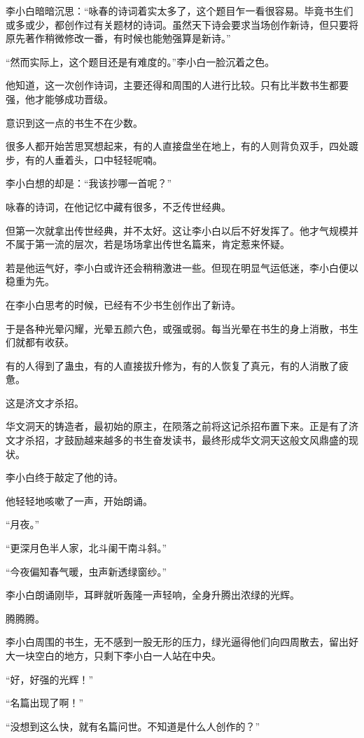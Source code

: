 \begin{this_body}
李小白暗暗沉思：“咏春的诗词着实太多了，这个题目乍一看很容易。毕竟书生们或多或少，都创作过有关题材的诗词。虽然天下诗会要求当场创作新诗，但只要将原先著作稍微修改一番，有时候也能勉强算是新诗。”

“然而实际上，这个题目还是有难度的。”李小白一脸沉着之色。

他知道，这一次创作诗词，主要还得和周围的人进行比较。只有比半数书生都要强，他才能够成功晋级。

意识到这一点的书生不在少数。

很多人都开始苦思冥想起来，有的人直接盘坐在地上，有的人则背负双手，四处踱步，有的人垂着头，口中轻轻呢喃。

李小白想的却是：“我该抄哪一首呢？”

咏春的诗词，在他记忆中藏有很多，不乏传世经典。

但第一次就拿出传世经典，并不太好。这让李小白以后不好发挥了。他才气规模并不属于第一流的层次，若是场场拿出传世名篇来，肯定惹来怀疑。

若是他运气好，李小白或许还会稍稍激进一些。但现在明显气运低迷，李小白便以稳重为先。

在李小白思考的时候，已经有不少书生创作出了新诗。

于是各种光晕闪耀，光晕五颜六色，或强或弱。每当光晕在书生的身上消散，书生们就都有收获。

有的人得到了蛊虫，有的人直接拔升修为，有的人恢复了真元，有的人消散了疲惫。

这是济文才杀招。

华文洞天的铸造者，最初始的原主，在陨落之前将这记杀招布置下来。正是有了济文才杀招，才鼓励越来越多的书生奋发读书，最终形成华文洞天这般文风鼎盛的现状。

李小白终于敲定了他的诗。

他轻轻地咳嗽了一声，开始朗诵。

“月夜。”

“更深月色半人家，北斗阑干南斗斜。”

“今夜偏知春气暖，虫声新透绿窗纱。”

李小白朗诵刚毕，耳畔就听轰隆一声轻响，全身升腾出浓绿的光辉。

腾腾腾。

李小白周围的书生，无不感到一股无形的压力，绿光逼得他们向四周散去，留出好大一块空白的地方，只剩下李小白一人站在中央。

“好，好强的光辉！”

“名篇出现了啊！”

“没想到这么快，就有名篇问世。不知道是什么人创作的？”


\end{this_body}
